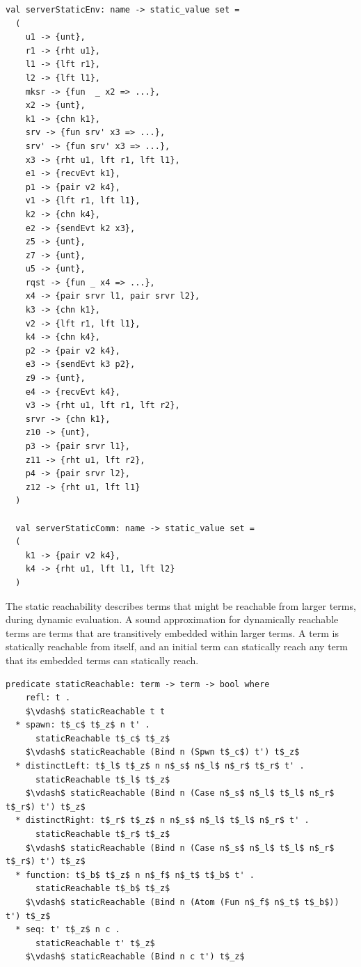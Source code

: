 \documentclass[letterpaper, 11pt]{extarticle}
\begin{document}
\begin{lstlisting}[language=sugar_lang, mathescape]
  val serverStaticEnv: name -> static_value set =
  (
    u1 -> {unt},
    r1 -> {rht u1},
    l1 -> {lft r1},
    l2 -> {lft l1},
    mksr -> {fun  _ x2 => ...},
    x2 -> {unt},
    k1 -> {chn k1},
    srv -> {fun srv' x3 => ...},
    srv' -> {fun srv' x3 => ...},
    x3 -> {rht u1, lft r1, lft l1},
    e1 -> {recvEvt k1},
    p1 -> {pair v2 k4},
    v1 -> {lft r1, lft l1},
    k2 -> {chn k4},
    e2 -> {sendEvt k2 x3},
    z5 -> {unt},
    z7 -> {unt},
    u5 -> {unt},
    rqst -> {fun _ x4 => ...},
    x4 -> {pair srvr l1, pair srvr l2},
    k3 -> {chn k1},
    v2 -> {lft r1, lft l1},
    k4 -> {chn k4},
    p2 -> {pair v2 k4},
    e3 -> {sendEvt k3 p2},
    z9 -> {unt},
    e4 -> {recvEvt k4},
    v3 -> {rht u1, lft r1, lft r2},
    srvr -> {chn k1},
    z10 -> {unt},
    p3 -> {pair srvr l1},
    z11 -> {rht u1, lft r2},
    p4 -> {pair srvr l2},
    z12 -> {rht u1, lft l1}
  )

  val serverStaticComm: name -> static_value set =
  (
    k1 -> {pair v2 k4},
    k4 -> {rht u1, lft l1, lft l2}
  )
\end{lstlisting}

The static reachability describes terms that might be reachable from larger
terms, during dynamic evaluation.
A sound approximation for dynamically reachable terms are
terms that are transitively embedded within larger terms.
A term is statically reachable from itself,
and an initial term can statically reach any term that its embedded terms can statically reach.

\begin{lstlisting}[language=logic, mathescape]
  predicate staticReachable: term -> term -> bool where
    refl: t .
    $\vdash$ staticReachable t t 
  * spawn: t$_c$ t$_z$ n t' . 
      staticReachable t$_c$ t$_z$
    $\vdash$ staticReachable (Bind n (Spwn t$_c$) t') t$_z$
  * distinctLeft: t$_l$ t$_z$ n n$_s$ n$_l$ n$_r$ t$_r$ t' . 
      staticReachable t$_l$ t$_z$
    $\vdash$ staticReachable (Bind n (Case n$_s$ n$_l$ t$_l$ n$_r$ t$_r$) t') t$_z$
  * distinctRight: t$_r$ t$_z$ n n$_s$ n$_l$ t$_l$ n$_r$ t' . 
      staticReachable t$_r$ t$_z$
    $\vdash$ staticReachable (Bind n (Case n$_s$ n$_l$ t$_l$ n$_r$ t$_r$) t') t$_z$
  * function: t$_b$ t$_z$ n n$_f$ n$_t$ t$_b$ t' . 
      staticReachable t$_b$ t$_z$
    $\vdash$ staticReachable (Bind n (Atom (Fun n$_f$ n$_t$ t$_b$)) t') t$_z$
  * seq: t' t$_z$ n c . 
      staticReachable t' t$_z$
    $\vdash$ staticReachable (Bind n c t') t$_z$
\end{lstlisting}
\end{document}
